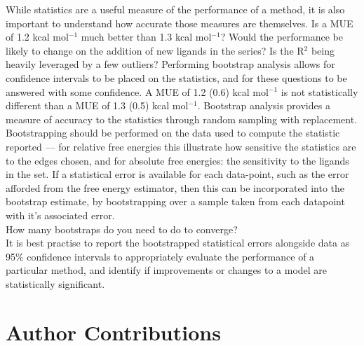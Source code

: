 \documentclass[9pt,bestpractices]{livecoms}
\begin{document}
While statistics are a useful measure of the performance of a method, it is also important to understand how accurate those measures are themselves. Is a MUE of 1.2 kcal mol$^{-1}$ much better than 1.3 kcal mol$^{-1}$? Would the performance be likely to change on the addition of new ligands in the series? Is the R$^2$ being heavily leveraged by a few outliers? Performing bootstrap analysis allows for confidence intervals to be placed on the statistics, and for these questions to be answered with some confidence. A MUE of 1.2 (0.6) kcal mol$^{-1}$ is not statistically different than a MUE of 1.3 (0.5) kcal mol$^{-1}$. Bootstrap analysis provides a measure of accuracy to the statistics through random sampling with replacement. Bootstrapping should be performed on the data used to compute the statistic reported --- for relative free energies this illustrate how sensitive the statistics are to the edges chosen, and for absolute free energies: the sensitivity to the ligands in the set. If a statistical error is available for each data-point, such as the error afforded from the free energy estimator, then this can be incorporated into the bootstrap estimate, by bootstrapping over a sample taken from each datapoint with it's associated error.\\
How many bootstraps do you need to do to converge?\\
It is best practise to report the bootstrapped statistical errors alongside data as 95\% confidence intervals to appropriately evaluate the performance of a particular method, and identify if improvements or changes to a model are statistically significant.


\section{Author Contributions}
%
\end{document}
